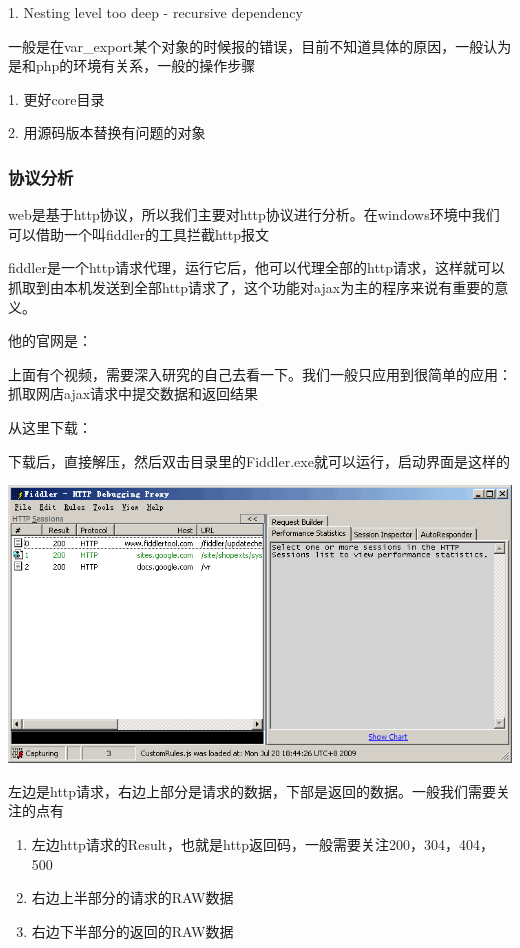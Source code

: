 \documentclass{article}
\begin{document}
1. Nesting level too deep - recursive dependency

一般是在var\_export某个对象的时候报的错误，目前不知道具体的原因，一般认为是和php的环境有关系，一般的操作步骤

1. 更好core目录

2. 用源码版本替换有问题的对象

\hypertarget{toc15}{}
\subsubsection{协议分析}
web是基于http协议，所以我们主要对http协议进行分析。在windows环境中我们可以借助一个叫fiddler的工具拦截http报文

fiddler是一个http请求代理，运行它后，他可以代理全部的http请求，这样就可以抓取到由本机发送到全部http请求了，这个功能对ajax为主的程序来说有重要的意义。

他的官网是：

上面有个视频，需要深入研究的自己去看一下。我们一般只应用到很简单的应用：抓取网店ajax请求中提交数据和返回结果

从这里下载：


下载后，直接解压，然后双击目录里的Fiddler.exe就可以运行，启动界面是这样的

\includegraphics{img/operation/debug/fildder/2.png}

左边是http请求，右边上部分是请求的数据，下部是返回的数据。一般我们需要关注的点有

\begin{enumerate}
\item 左边http请求的Result，也就是http返回码，一般需要关注200，304，404，500
\item 右边上半部分的请求的RAW数据
\item 右边下半部分的返回的RAW数据
\end{enumerate}
\end{document}
